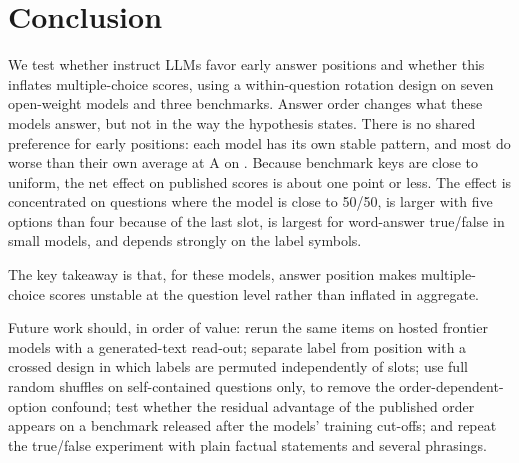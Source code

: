 \section{Conclusion}
\label{sec:conclusion}

We test whether instruct LLMs favor early answer positions and whether this inflates multiple-choice scores, using a within-question rotation design on seven open-weight models and three benchmarks.
Answer order changes what these models answer, but not in the way the hypothesis states.
There is no shared preference for early positions: each model has its own stable pattern, and most do worse than their own average at A on \mmlu.
Because benchmark keys are close to uniform, the net effect on published scores is about one point or less.
The effect is concentrated on questions where the model is close to 50/50, is larger with five options than four because of the last slot, is largest for word-answer true/false in small models, and depends strongly on the label symbols.

The key takeaway is that, for these models, answer position makes multiple-choice scores unstable at the question level rather than inflated in aggregate.

Future work should, in order of value: rerun the same items on hosted frontier models with a generated-text read-out; separate label from position with a crossed design in which labels are permuted independently of slots; use full random shuffles on self-contained questions only, to remove the order-dependent-option confound; test whether the residual advantage of the published \mmlu order appears on a benchmark released after the models' training cut-offs; and repeat the true/false experiment with plain factual statements and several phrasings.
